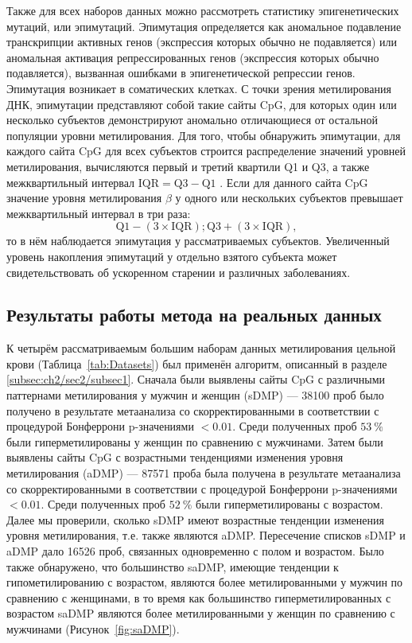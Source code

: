 Также для всех наборов данных можно рассмотреть статистику эпигенетических мутаций, или эпимутаций. Эпимутация определяется как аномальное подавление транскрипции активных генов (экспрессия которых обычно не подавляется) или аномальная активация репрессированных генов (экспрессия которых обычно подавляется), вызванная ошибками в эпигенетической репрессии генов. Эпимутация возникает в соматических клетках. С точки зрения метилирования ДНК, эпимутации представляют собой такие сайты CpG, для которых один или несколько субъектов демонстрируют аномально отличающиеся от остальной популяции уровни метилирования. Для того, чтобы обнаружить эпимутации, для каждого сайта CpG для всех субъектов строится распределение значений уровней метилирования, вычисляются первый и третий квартили Q1 и Q3, а также межквартильный интервал $\text{IQR} = \text{Q3} - \text{Q1}$ \autocite{Gentilini2015}. Если для данного сайта CpG значение уровня метилирования $\beta$ у одного или нескольких субъектов превышает межквартильный интервал в три раза:
\begin{equation}
\label{eq:iqr}
\text{Q1} - (3 \times \text{IQR}); \text{Q3} + (3 \times \text{IQR}), 
\end{equation}
то в нём наблюдается эпимутация у рассматриваемых субъектов. Увеличенный уровень накопления эпимутаций у отдельно взятого субъекта может свидетельствовать об ускоренном старении и различных заболеваниях.

\subsection{Результаты работы метода на реальных данных}\label{subsec:ch2/sec2/subsec2}

К четырём рассматриваемым большим наборам данных метилирования цельной крови (Таблица~\ref{tab:Datasets}) был применён алгоритм, описанный в разделе \ref{subsec:ch2/sec2/subsec1}. Сначала были выявлены сайты CpG с различными паттернами метилирования у мужчин и женщин (sDMP) --- 38100 проб было получено в результате метаанализа со скорректированными в соответствии с процедурой Бонферрони p-значениями $< 0.01$. Среди полученных проб $53~\%$ были гиперметилированы у женщин по сравнению с мужчинами. Затем были выявлены сайты CpG с возрастными тенденциями изменения уровня метилирования (aDMP) --- 87571 проба была получена в результате метаанализа со скорректированными в соответствии с процедурой Бонферрони p-значениями $< 0.01$. Среди полученных проб $52~\%$ были гиперметилированы с возрастом. Далее мы проверили, сколько sDMP имеют возрастные тенденции изменения уровня метилирования, т.е. также являются aDMP. Пересечение списков sDMP и aDMP дало 16526 проб, связанных одновременно с полом и возрастом. Было также обнаружено, что большинство saDMP, имеющие тенденции к гипометилированию с возрастом, являются более метилированными у мужчин по сравнению с женщинами, в то время как большинство гиперметилированных с возрастом saDMP являются более метилированными у женщин по сравнению с мужчинами (Рисунок~\ref{fig:saDMP}).

